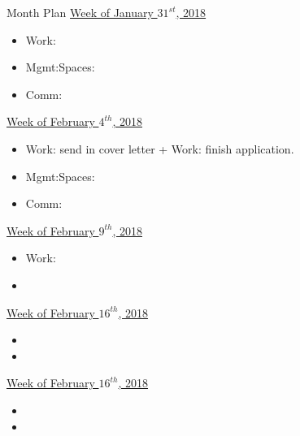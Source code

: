 \begin{columns}
\begin{column}{0.10\linewidth}
\begin{block}{Month Plan}
\underline{Week of January $31^{st}$, 2018}
\begin{itemize}
\tiny \item \tiny Work: 
\item \tiny Mgmt:Spaces: 
\item \tiny Comm: 
\end{itemize}

\underline{Week of February $4^{th}$, 2018}
\begin{itemize}
\tiny \item \tiny Work: send in cover letter + Work: finish application.  
\item \tiny Mgmt:Spaces: 
\item \tiny Comm: 
\end{itemize}

\underline{Week of February $9^{th}$, 2018}
\begin{itemize}
\tiny \item \tiny Work: 
\item \tiny
\end{itemize}

\underline{Week of February $16^{th}$, 2018}
\begin{itemize}
\tiny \item \tiny 
\item \tiny
\end{itemize}

\underline{Week of February $16^{th}$, 2018}
\begin{itemize}
\tiny \item \tiny 
\item \tiny
\end{itemize}

\end{block}


\end{column}
\end{columns}
